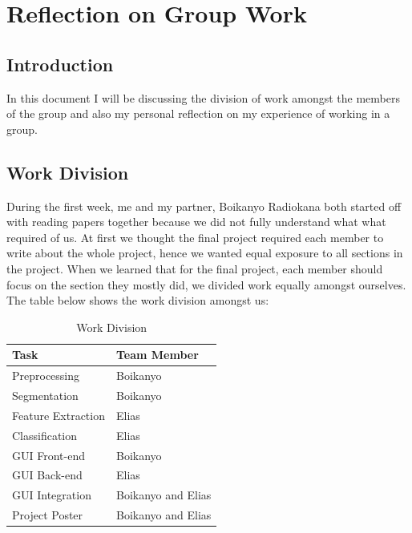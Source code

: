 \documentclass[10pt,twocolumn]{witseiepaper}
\begin{document}


\newpage
\onecolumn
\appendices

\section{Reflection on Group Work}

\subsection{\textbf{Introduction}}
In this document I will be discussing the division of work amongst the members of the group and also my personal reflection on my experience of working in a group.

\subsection{\textbf{Work Division}}
During the first week, me and my partner, Boikanyo Radiokana both started off with reading papers together because we did not fully understand what what required of us. At first we thought the final project required each member to write about the whole project, hence we wanted equal exposure to all sections in the project. When we learned that for the final project, each member should focus on the section they mostly did, we divided work equally amongst ourselves. The table below shows the work division amongst us:

\begin{table}[h!]
\centering
\caption{Work Division}
\label{undefined}
\begin{tabular}{|l|l|}
\hline
\textbf{Task} & \textbf{Team Member} \\ \hline
Preprocessing & Boikanyo \\ \hline
Segmentation & Boikanyo \\ \hline
Feature Extraction & Elias \\ \hline
Classification & Elias \\ \hline
GUI Front-end & Boikanyo \\ \hline
GUI Back-end & Elias \\ \hline
GUI Integration & Boikanyo and Elias \\ \hline
Project Poster & Boikanyo and Elias \\ \hline
\end{tabular}
\end{table}
\end{document}
